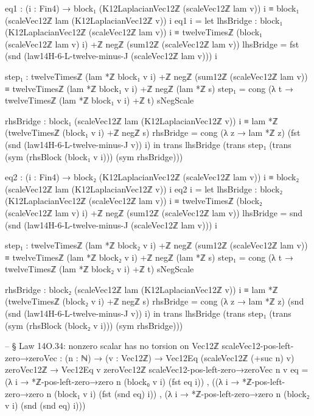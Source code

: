\documentclass[11pt,a4paper]{book}
\begin{document}
\begin{code}
    eq1 : (i : Fin4) → block₁ (K12LaplacianVec12ℤ (scaleVec12ℤ lam v)) i ≡ block₁ (scaleVec12ℤ lam (K12LaplacianVec12ℤ v)) i
    eq1 i =
      let
        lhsBridge : block₁ (K12LaplacianVec12ℤ (scaleVec12ℤ lam v)) i ≡
                    twelveTimesℤ (block₁ (scaleVec12ℤ lam v) i) +ℤ negℤ (sum12ℤ (scaleVec12ℤ lam v))
        lhsBridge = fst (snd (law14H-6-L-twelve-minus-J (scaleVec12ℤ lam v))) i

        step₁ :
          twelveTimesℤ (lam *ℤ block₁ v i) +ℤ negℤ (sum12ℤ (scaleVec12ℤ lam v))
            ≡
          twelveTimesℤ (lam *ℤ block₁ v i) +ℤ negℤ (lam *ℤ s)
        step₁ = cong (λ t → twelveTimesℤ (lam *ℤ block₁ v i) +ℤ t) sNegScale

        rhsBridge : block₁ (scaleVec12ℤ lam (K12LaplacianVec12ℤ v)) i ≡
                    lam *ℤ (twelveTimesℤ (block₁ v i) +ℤ negℤ s)
        rhsBridge = cong (λ z → lam *ℤ z) (fst (snd (law14H-6-L-twelve-minus-J v)) i)
      in
      trans lhsBridge (trans step₁ (trans (sym (rhsBlock (block₁ v i))) (sym rhsBridge)))

    eq2 : (i : Fin4) → block₂ (K12LaplacianVec12ℤ (scaleVec12ℤ lam v)) i ≡ block₂ (scaleVec12ℤ lam (K12LaplacianVec12ℤ v)) i
    eq2 i =
      let
        lhsBridge : block₂ (K12LaplacianVec12ℤ (scaleVec12ℤ lam v)) i ≡
                    twelveTimesℤ (block₂ (scaleVec12ℤ lam v) i) +ℤ negℤ (sum12ℤ (scaleVec12ℤ lam v))
        lhsBridge = snd (snd (law14H-6-L-twelve-minus-J (scaleVec12ℤ lam v))) i

        step₁ :
          twelveTimesℤ (lam *ℤ block₂ v i) +ℤ negℤ (sum12ℤ (scaleVec12ℤ lam v))
            ≡
          twelveTimesℤ (lam *ℤ block₂ v i) +ℤ negℤ (lam *ℤ s)
        step₁ = cong (λ t → twelveTimesℤ (lam *ℤ block₂ v i) +ℤ t) sNegScale

        rhsBridge : block₂ (scaleVec12ℤ lam (K12LaplacianVec12ℤ v)) i ≡
                    lam *ℤ (twelveTimesℤ (block₂ v i) +ℤ negℤ s)
        rhsBridge = cong (λ z → lam *ℤ z) (snd (snd (law14H-6-L-twelve-minus-J v)) i)
      in
      trans lhsBridge (trans step₁ (trans (sym (rhsBlock (block₂ v i))) (sym rhsBridge)))

-- § Law 14O.34: nonzero scalar has no torsion on Vec12ℤ
scaleVec12-pos-left-zero→zeroVec : (n : ℕ) → (v : Vec12ℤ) →
  Vec12Eq (scaleVec12ℤ (+suc n) v) zeroVec12ℤ → Vec12Eq v zeroVec12ℤ
scaleVec12-pos-left-zero→zeroVec n v eq =
  (λ i → *ℤ-pos-left-zero→zero n (block₀ v i) (fst eq i)) ,
  ((λ i → *ℤ-pos-left-zero→zero n (block₁ v i) (fst (snd eq) i)) ,
   (λ i → *ℤ-pos-left-zero→zero n (block₂ v i) (snd (snd eq) i)))


\end{code}
\end{document}

